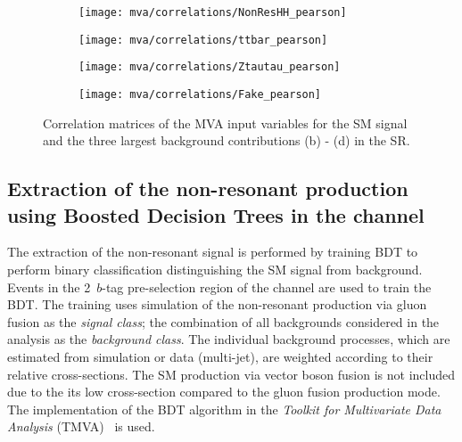 \begin{figure}[htbp]
  \centering

  \begin{subfigure}[t]{.49\textwidth}
    \texttt{[image: mva/correlations/NonResHH\_pearson]}
  \end{subfigure}\hfill %
  \begin{subfigure}[t]{.49\textwidth}
    \texttt{[image: mva/correlations/ttbar\_pearson]}
    \subcaption{\ttbar}
  \end{subfigure}

  \begin{subfigure}[t]{.49\textwidth}
    \texttt{[image: mva/correlations/Ztautau\_pearson]}
  \end{subfigure}\hfill %
  \begin{subfigure}[t]{.49\textwidth}
    \texttt{[image: mva/correlations/Fake\_pearson]}
  \end{subfigure}

  \caption{Correlation matrices of the MVA input variables for the SM
    \HH signal and the three largest background contributions (b) -
    (d) in the \hadhad SR.}
  \label{fig:mva_input_correlations}
\end{figure}


\subsection{Extraction of the non-resonant \HH production using
  Boosted Decision Trees in the \hadhad channel}
\label{sec:mva_smbdt}

The extraction of the non-resonant \HH signal is performed by training
BDT to perform binary classification distinguishing the SM \HH signal
from background. Events in the 2~$b$-tag pre-selection region of the
\hadhad channel are used to train the BDT. The training uses
simulation of the non-resonant \HH production via gluon fusion as the
\emph{signal class}; the combination of all backgrounds considered in
the analysis as the \emph{background class}.  The individual
background processes, which are estimated from simulation or data
(multi-jet), are weighted according to their relative
cross-sections. The SM \HH production via vector boson fusion is not
included due to the its low cross-section compared to the gluon fusion
production mode. The implementation of the BDT algorithm in the
\emph{Toolkit for Multivariate Data Analysis}
(TMVA)~\cite{Hocker:2007ht} is used.


